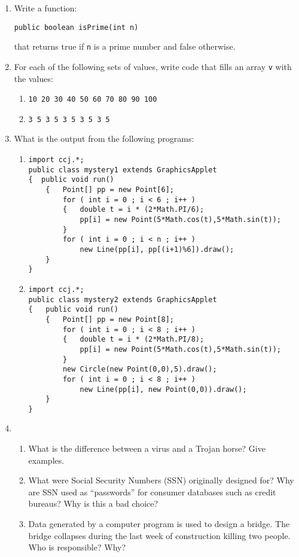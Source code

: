 \begin{enumerate}
    \item Write a function:
\begin{verbatim}
public boolean isPrime(int n)
\end{verbatim}
	that returns true if {\tt n} is a prime number and 
	false otherwise.
	

    \item For each of the following sets of values, write code that
	fills an array {\tt v} with the values:
	\begin{enumerate}
	    \item {\tt 10 20 30 40 50 60 70 80 90 100}
	    \item {\tt 3 5 3 5 3 5 3 5 3 5 }
	\end{enumerate}

    \item What is the output from the following programs:
	\begin{enumerate}
	    \item 
\begin{verbatim}
import ccj.*;
public class mystery1 extends GraphicsApplet
{  public void run()
    {   Point[] pp = new Point[6];
        for ( int i = 0 ; i < 6 ; i++ )
        {   double t = i * (2*Math.PI/6);
            pp[i] = new Point(5*Math.cos(t),5*Math.sin(t));
        }       
        for ( int i = 0 ; i < n ; i++ )
            new Line(pp[i], pp[(i+1)%6]).draw();
    }
}
\end{verbatim}

	    \item
\begin{verbatim}
import ccj.*;
public class mystery2 extends GraphicsApplet
{   public void run()
    {   Point[] pp = new Point[8];
        for ( int i = 0 ; i < 8 ; i++ )
        {   double t = i * (2*Math.PI/8);
            pp[i] = new Point(5*Math.cos(t),5*Math.sin(t));
        }       
        new Circle(new Point(0,0),5).draw();
        for ( int i = 0 ; i < 8 ; i++ )
            new Line(pp[i], new Point(0,0)).draw();
    }
}
\end{verbatim}
	\end{enumerate}

    \item 
	\begin{enumerate}
	    \item What is the difference between a virus and a Trojan 
	    	horse?  Give examples.
	    \item What were Social Security Numbers (SSN) originally
	    	designed for?  Why are SSN used as ``passwords'' for
	    	consumer databases such as credit bureaus?  Why is 
	    	this a bad choice?
	    \item Data generated by a computer program is used to 
	    	design a bridge.  The bridge collapses during the 
		last week of construction killing two people.
	    	Who is responsible?  Why?
	\end{enumerate}



\end{enumerate}
